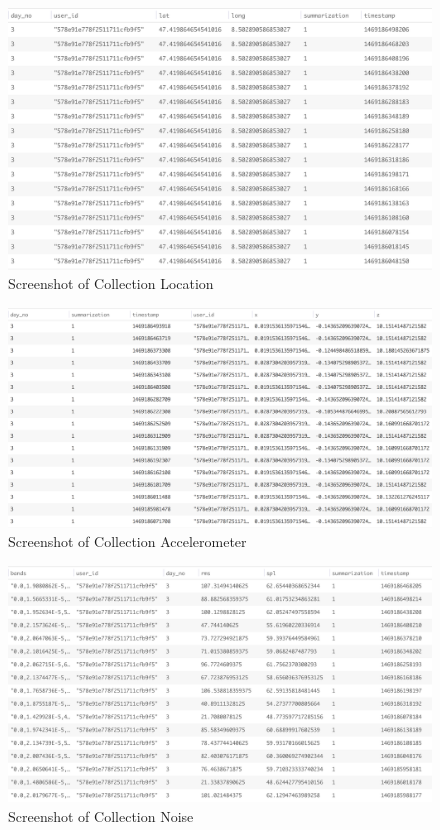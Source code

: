 \begin{figure}[ht!]
\centering
\includegraphics[width=\textwidth,keepaspectratio,height=0.6\textwidth]{./images/collection_loc}
\caption{Screenshot of Collection Location}
\label{fig:col_loc}
\end{figure}

\begin{figure}[ht!]
\centering
\includegraphics[width=\textwidth,keepaspectratio,height=0.6\textwidth]{./images/collection_acc}
\caption{Screenshot of Collection Accelerometer}
\label{fig:col_acc}
\end{figure}

\begin{figure}[ht!]
\centering
\includegraphics[width=\textwidth,keepaspectratio,height=0.6\textwidth]{./images/collection_noise}
\caption{Screenshot of Collection Noise}
\label{fig:col_noise}
\end{figure}

